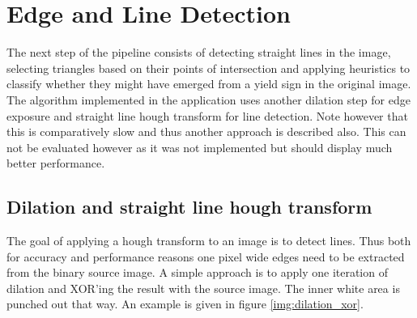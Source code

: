 \documentclass{report}
\begin{document}
\section{Edge and Line Detection}
\label{sec:pipeline_edgedet}

The next step of the pipeline consists of detecting straight lines in
the image, selecting triangles based on their points of intersection
and applying heuristics to classify whether they might have emerged
from a yield sign in the original image. The algorithm implemented in
the application uses another dilation step for edge exposure and
straight line hough transform for line detection. Note however that
this is comparatively slow and thus another approach is described
also. This can not be evaluated however as it was not implemented but
should display much better performance.

\subsection{Dilation and straight line hough transform}
\label{sec:pipeline_linedet}

The goal of applying a hough transform to an image is to detect
lines. Thus both for accuracy and performance reasons one pixel wide
edges need to be extracted from the binary source image. A simple
approach is to apply one iteration of dilation and XOR'ing the result
with the source image. The inner white area is punched out that
way. An example is given in figure \ref{img:dilation_xor}.
\end{document}
